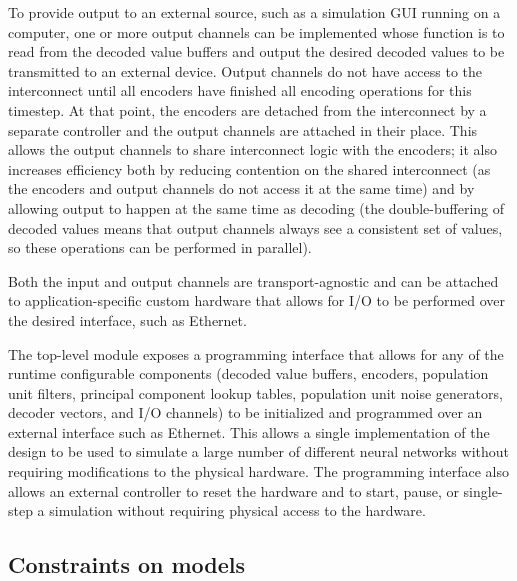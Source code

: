\documentclass[english]{article}
\begin{document}
To provide output to an external source, such as a simulation GUI running on a computer, one or more output channels
can be implemented whose function is to read from the decoded value buffers and output the desired decoded values to be transmitted
to an external device. Output channels do not have access to the interconnect until all encoders have finished all
encoding operations for this timestep. At that point, the encoders are detached from the interconnect by a separate controller and the output
channels are attached in their place. This allows the output channels to share interconnect logic with the encoders;
it also increases efficiency both by reducing contention on the shared interconnect (as the encoders and output channels
do not access it at the same time) and by allowing output to happen at the same time as decoding
(the double-buffering of decoded values means that output channels always see a consistent set of values,
so these operations can be performed in parallel).

Both the input and output channels are transport-agnostic and can be attached to application-specific custom hardware that allows for
I/O to be performed over the desired interface, such as Ethernet.

The top-level module exposes a programming interface that allows for any of the runtime configurable components
(decoded value buffers, encoders, population unit filters, principal component lookup tables,
population unit noise generators, decoder vectors, and I/O channels) to be initialized and programmed
over an external interface such as Ethernet. This allows a single implementation of the design
to be used to simulate a large number of different neural networks without requiring modifications to the physical hardware.
The programming interface also allows an external controller to reset the hardware and to start, pause, or single-step a simulation
without requiring physical access to the hardware.

\subsection{Constraints on models}
\end{document}
